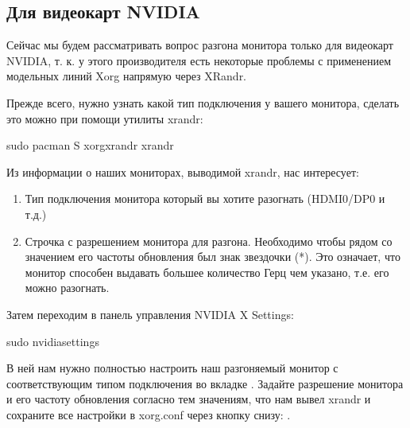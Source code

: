 \documentclass[letterpaper,10pt,russian,openany]{sphinxmanual}
\begin{document}
\ignorespaces 

\subsection{Для видеокарт NVIDIA}
\label{\detokenize{source/first-steps:monitor-overlocking-nvidia}}\label{\detokenize{source/first-steps:index-13}}\label{\detokenize{source/first-steps:id13}}
\sphinxAtStartPar
Сейчас мы будем рассматривать вопрос разгона монитора только для видеокарт NVIDIA,
т. к. у этого производителя есть некоторые проблемы с применением модельных линий Xorg напрямую через XRandr.

\sphinxAtStartPar
Прежде всего, нужно узнать какой тип подключения у вашего монитора, сделать это можно при помощи утилиты xrandr:

\begin{sphinxVerbatim}[commandchars=\\\{\}]
sudo pacman \PYGZhy{}S xorg\PYGZhy{}xrandr 
xrandr                     
\end{sphinxVerbatim}

\sphinxAtStartPar
Из информации о наших мониторах, выводимой xrandr, нас интересует:
\begin{enumerate}
%
\item {} 
\sphinxAtStartPar
Тип подключения монитора который вы хотите разогнать (HDMI\sphinxhyphen{}0/DP\sphinxhyphen{}0 и т.д.)

\item {} 
\sphinxAtStartPar
Строчка с разрешением монитора для разгона.
Необходимо чтобы рядом со значением его частоты обновления был знак звездочки (*).
Это означает, что монитор способен выдавать большее количество Герц чем указано, т.е. его можно разогнать.

\end{enumerate}

\sphinxAtStartPar
Затем переходим в панель управления NVIDIA X Settings:

\begin{sphinxVerbatim}[commandchars=\\\{\}]
sudo nvidia\PYGZhy{}settings
\end{sphinxVerbatim}

\sphinxAtStartPar
В ней нам нужно полностью настроить наш разгоняемый монитор с соответствующим типом подключения во вкладке  .
Задайте разрешение монитора и его частоту обновления согласно тем значениям,
что нам вывел xrandr и сохраните все настройки в xorg.conf через кнопку снизу: .
\end{document}
